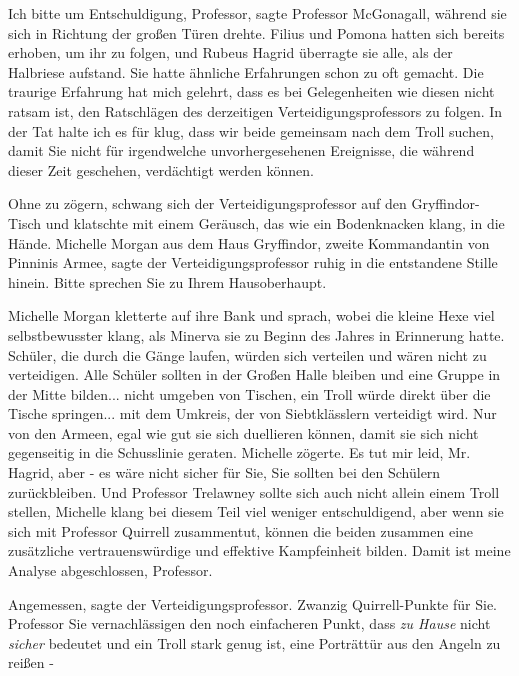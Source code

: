\glqq{}Ich bitte um Entschuldigung, Professor\grqq{}, sagte Professor McGonagall,
während sie sich in Richtung der großen Türen drehte. Filius und Pomona hatten
sich bereits erhoben, um ihr zu folgen, und Rubeus Hagrid überragte sie alle,
als der Halbriese aufstand. Sie hatte ähnliche Erfahrungen schon zu oft gemacht.
\glqq{}Die traurige Erfahrung hat mich gelehrt, dass es bei Gelegenheiten wie
diesen nicht ratsam ist, den Ratschlägen des derzeitigen Verteidigungsprofessors
zu folgen. In der Tat halte ich es für klug, dass wir beide gemeinsam nach dem
Troll suchen, damit Sie nicht für irgendwelche unvorhergesehenen Ereignisse, die
während dieser Zeit geschehen, verdächtigt werden können.\grqq{}

Ohne zu zögern, schwang sich der Verteidigungsprofessor auf den Gryffindor-Tisch
und klatschte mit einem Geräusch, das wie ein Bodenknacken klang, in die Hände.
\glqq{}Michelle Morgan aus dem Haus Gryffindor, zweite Kommandantin von Pinninis
Armee\grqq{}, sagte der Verteidigungsprofessor ruhig in die entstandene Stille
hinein. \glqq{}Bitte sprechen Sie zu Ihrem Hausoberhaupt.\grqq{}

Michelle Morgan kletterte auf ihre Bank und sprach, wobei die kleine Hexe viel
selbstbewusster klang, als Minerva sie zu Beginn des Jahres in Erinnerung hatte.
\glqq{}Schüler, die durch die Gänge laufen, würden sich verteilen und wären nicht
zu verteidigen. Alle Schüler sollten in der Großen Halle bleiben und eine Gruppe
in der Mitte bilden... nicht umgeben von Tischen, ein Troll würde direkt über
die Tische springen... mit dem Umkreis, der von Siebtklässlern verteidigt wird.
Nur von den Armeen, egal wie gut sie sich duellieren können, damit sie sich
nicht gegenseitig in die Schusslinie geraten.\grqq{} Michelle zögerte. \glqq{}Es
tut mir leid, Mr. Hagrid, aber - es wäre nicht sicher für Sie, Sie sollten bei
den Schülern zurückbleiben. Und Professor Trelawney sollte sich auch nicht
allein einem Troll stellen\grqq{}, Michelle klang bei diesem Teil viel weniger
entschuldigend, \glqq{}aber wenn sie sich mit Professor Quirrell zusammentut,
können die beiden zusammen eine zusätzliche vertrauenswürdige und effektive
Kampfeinheit bilden. Damit ist meine Analyse abgeschlossen, Professor.\grqq{}

\glqq{}Angemessen\grqq{}, sagte der Verteidigungsprofessor. \glqq{}Zwanzig
Quirrell-Punkte für Sie. Professor Sie vernachlässigen den noch einfacheren
Punkt, dass \emph{zu Hause} nicht \emph{sicher} bedeutet und ein Troll stark
genug ist, eine Porträttür aus den Angeln zu reißen -\grqq{}

